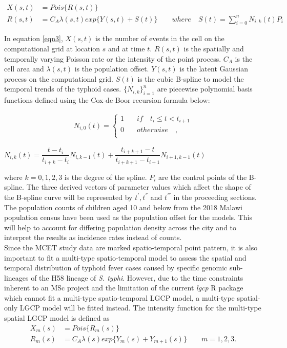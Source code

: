 \begin{align}
    \label{eqn3}
    X(s,t) &= Pois \lbrace R(s,t)\rbrace \nonumber \\
    R(s,t) &= C_A \lambda(s,t) exp \lbrace Y(s,t) + S(t)\rbrace \quad \quad where \quad S(t) = \displaystyle \sum_{i=0}^{n} N_{i,k}(t)P_i
\end{align}

In equation \ref{eqn3}, $X(s,t)$ is the number of events in the cell on the computational grid at location $s$ and at time $t$. $R(s,t)$ is the spatially and temporally varying Poisson rate or the intensity of the point process. $C_A$ is the cell area and $\lambda(s,t)$ is the population offset. $Y(s,t)$ is the latent Gaussian process on the computational grid. $S(t)$ is the cubic B-spline to model the temporal trends of the typhoid cases. $\lbrace N_{i,k} \rbrace_{i=1}^n$ are piecewise polynomial basis functions defined using the Cox-de Boor recursion formula below:

\begin{align}
    N_{i,0}(t) = \left\{
    \begin{array}{cl}
        1 & \quad if \quad t_i \leq t < t_{i+1} \\
        0 & \quad otherwise\quad,             \\
    \end{array} \right.
\end{align}

\begin{center}
    $N_{i,k}(t) = \dfrac{t - t_i}{t_{i+k} - t_i} N_{i,k-1}(t) + \dfrac{t_{i+k+1}-t}{t_{i+k+1}-t_{i+1}} N_{i+1,k-1}(t)$
\end{center}

where $k = 0,1,2,3$ is the degree of the spline. $P_i$ are the control points of the B-spline. The three derived vectors of parameter values which affect the shape of the B-spline curve will be represented by $t^{'}, t^{''}$ and $t^{'''}$ in the proceeding sections. The population counts of children aged 10 and below from the 2018 Malawi population census have been used as the population offset for the models. This will help to account for differing population density across the city and to interpret the results as incidence rates instead of counts.\\

Since the MCET study data are marked spatio-temporal point pattern, it is also important to fit a multi-type spatio-temporal model to assess the spatial and temporal distribution of typhoid fever cases caused by specific genomic sub-lineages of the H58 lineage of \textit{S. typhi}. However, due to the time constraints inherent to an MSc project and the limitation of the current \textit{lgcp} R package which cannot fit a multi-type spatio-temporal LGCP model, a multi-type spatial-only LGCP model will be fitted instead. The intensity function for the multi-type spatial LGCP model is defined as
\begin{align}
    \label{eqn4}
    X_m(s) &= Pois \lbrace R_m(s)\rbrace \nonumber \\
    R_m(s) &= C_A \lambda(s) exp \lbrace Y_m(s) + Y_{m+1}(s)\rbrace \quad \quad m =  1,2,3.
\end{align}

